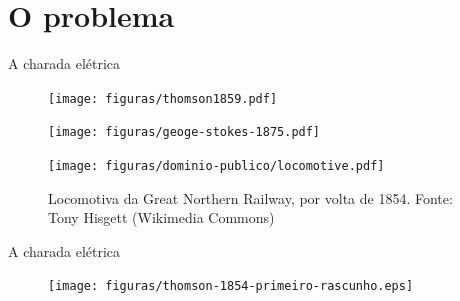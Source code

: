 \documentclass[aspectratio=169]{beamer}
\begin{document}
\section{O problema}
\begin{frame}{A charada elétrica}
\begin{minipage}{0.5\textwidth}
\centering
\begin{figure}[htbp]
	\texttt{[image: figuras/thomson1859.pdf]}
\end{figure}		
\begin{figure}[htbp]
	\texttt{[image: figuras/geoge-stokes-1875.pdf]}
\end{figure}		
\end{minipage}
\begin{minipage}{0.47\textwidth}
	\centering
\begin{figure}[htbp]
	\texttt{[image: figuras/dominio-publico/locomotive.pdf]}
	\caption{Locomotiva da Great Northern Railway, por volta de 1854. Fonte: Tony Hisgett (Wikimedia Commons)}
\end{figure}
\end{minipage}
\end{frame}


\begin{frame}{A charada elétrica}
\begin{figure}[p]
	\centering
	\texttt{[image: figuras/thomson-1854-primeiro-rascunho.eps]}
	\label{fig:thomson1854-primeiro-rascunho} 
\end{figure}
\end{frame}
\end{document}

